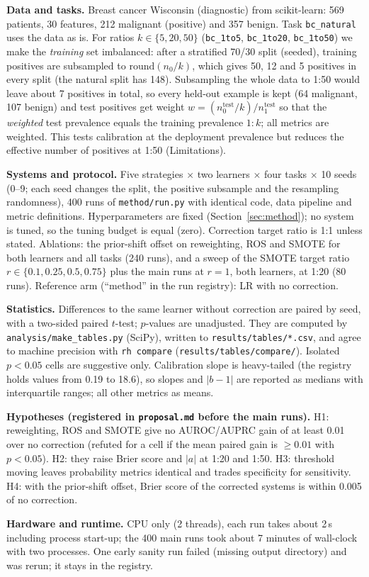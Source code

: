 \textbf{Data and tasks.} Breast cancer Wisconsin (diagnostic) from scikit-learn: 569 patients, 30 features, 212 malignant (positive) and 357 benign. Task \texttt{bc\_natural} uses the data as is. For ratios $k\in\{5,20,50\}$ (\texttt{bc\_1to5}, \texttt{bc\_1to20}, \texttt{bc\_1to50}) we make the \emph{training} set imbalanced: after a stratified 70/30 split (seeded), training positives are subsampled to $\mathrm{round}(n_0/k)$, which gives 50, 12 and 5 positives in every split (the natural split has 148). Subsampling the whole data to 1:50 would leave about 7 positives in total, so every held-out example is kept (64 malignant, 107 benign) and test positives get weight $w=(n_0^{\text{test}}/k)/n_1^{\text{test}}$ so that the \emph{weighted} test prevalence equals the training prevalence $1:k$; all metrics are weighted. This tests calibration at the deployment prevalence but reduces the effective number of positives at 1:50 (Limitations).

\textbf{Systems and protocol.} Five strategies $\times$ two learners $\times$ four tasks $\times$ 10 seeds (0--9; each seed changes the split, the positive subsample and the resampling randomness), 400 runs of \texttt{method/run.py} with identical code, data pipeline and metric definitions. Hyperparameters are fixed (Section~\ref{sec:method}); no system is tuned, so the tuning budget is equal (zero). Correction target ratio is 1:1 unless stated. Ablations: the prior-shift offset on reweighting, ROS and SMOTE for both learners and all tasks (240 runs), and a sweep of the SMOTE target ratio $r\in\{0.1,0.25,0.5,0.75\}$ plus the main runs at $r=1$, both learners, at 1:20 (80 runs). Reference arm (``method'' in the run registry): LR with no correction.

\textbf{Statistics.} Differences to the same learner without correction are paired by seed, with a two-sided paired $t$-test; $p$-values are unadjusted. They are computed by \texttt{analysis/make\_tables.py} (SciPy), written to \texttt{results/tables/*.csv}, and agree to machine precision with \texttt{rh compare} (\texttt{results/tables/compare/}). Isolated $p<0.05$ cells are suggestive only. Calibration slope is heavy-tailed (the registry holds values from 0.19 to 18.6), so slopes and $|b-1|$ are reported as medians with interquartile ranges; all other metrics as means.

\textbf{Hypotheses (registered in \texttt{proposal.md} before the main runs).} H1: reweighting, ROS and SMOTE give no AUROC/AUPRC gain of at least 0.01 over no correction (refuted for a cell if the mean paired gain is $\ge0.01$ with $p<0.05$). H2: they raise Brier score and $|a|$ at 1:20 and 1:50. H3: threshold moving leaves probability metrics identical and trades specificity for sensitivity. H4: with the prior-shift offset, Brier score of the corrected systems is within 0.005 of no correction.

\textbf{Hardware and runtime.} CPU only (2 threads), each run takes about 2\,s including process start-up; the 400 main runs took about 7 minutes of wall-clock with two processes. One early sanity run failed (missing output directory) and was rerun; it stays in the registry.
